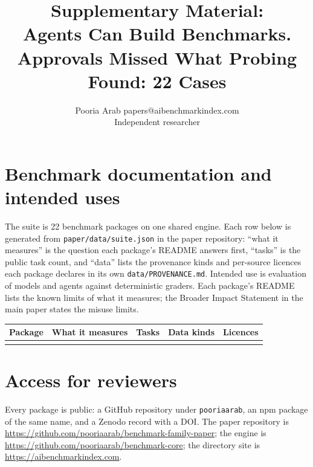 \documentclass[twoside,11pt]{article}
\begin{document}
\title{Supplementary Material:\\Agents Can Build Benchmarks. Approvals Missed What Probing Found: 22 Cases}
\author{\name Pooria Arab \email papers@aibenchmarkindex.com \\
       \addr Independent researcher}

\maketitle

\section{Benchmark documentation and intended uses}
The suite is 22 benchmark packages on one shared engine. Each row below
is generated from \texttt{paper/data/suite.json} in the paper repository:
``what it measures'' is the question each package's README answers first,
``tasks'' is the public task count, and ``data'' lists the provenance
kinds and per-source licences each package declares in its own
\texttt{data/PROVENANCE.md}. Intended use is evaluation of models and
agents against deterministic graders. Each package's README lists the known
limits of what it measures; the Broader Impact Statement in the main paper
states the misuse limits.

\begin{center}\small
\setlength{\tabcolsep}{4pt}
\begin{longtable}{@{}>{\raggedright\arraybackslash}p{}>{\raggedright\arraybackslash}p{}>{\raggedright\arraybackslash}p{}>{\raggedright\arraybackslash}p{}>{\raggedright\arraybackslash}p{}@{}}
\toprule
Package & What it measures & Tasks & Data kinds & Licences \\
\midrule
\endhead
\bottomrule
\endfoot

\end{longtable}
\end{center}

\section{Access for reviewers}
Every package is public: a GitHub repository under \texttt{pooriaarab},
an npm package of the same name, and a Zenodo record with a DOI. The
paper repository is
\url{https://github.com/pooriaarab/benchmark-family-paper}; the engine is
\url{https://github.com/pooriaarab/benchmark-core}; the directory site is
\url{https://aibenchmarkindex.com}.
\end{document}

